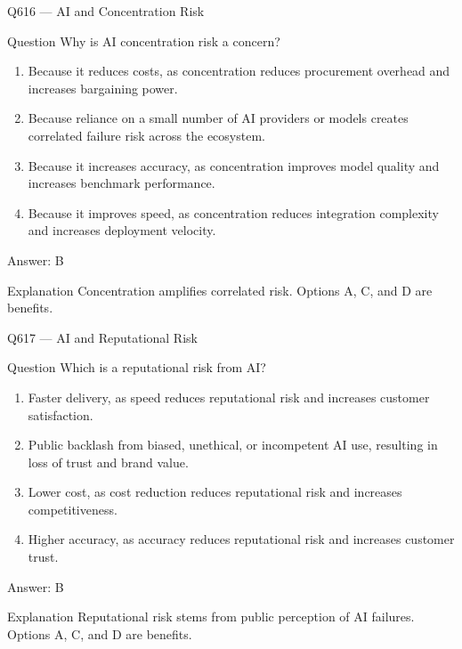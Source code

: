 \documentclass[aspectratio=169,8pt]{beamer}
\begin{document}
	\begin{frame}{Q616 --- AI and Concentration Risk}
		\begin{block}{Question}
			Why is AI concentration risk a concern?
			\begin{enumerate}
				\item Because it reduces costs, as concentration reduces procurement overhead and increases bargaining power.
				\item Because reliance on a small number of AI providers or models creates correlated failure risk across the ecosystem.
				\item Because it increases accuracy, as concentration improves model quality and increases benchmark performance.
				\item Because it improves speed, as concentration reduces integration complexity and increases deployment velocity.
			\end{enumerate}
		\end{block}
		\begin{exampleblock}{Answer: B}\end{exampleblock}
		\begin{block}{Explanation}
			Concentration amplifies correlated risk. Options A, C, and D are benefits.
		\end{block}
	\end{frame}
	
	\begin{frame}{Q617 --- AI and Reputational Risk}
		\begin{block}{Question}
			Which is a reputational risk from AI?
			\begin{enumerate}
				\item Faster delivery, as speed reduces reputational risk and increases customer satisfaction.
				\item Public backlash from biased, unethical, or incompetent AI use, resulting in loss of trust and brand value.
				\item Lower cost, as cost reduction reduces reputational risk and increases competitiveness.
				\item Higher accuracy, as accuracy reduces reputational risk and increases customer trust.
			\end{enumerate}
		\end{block}
		\begin{exampleblock}{Answer: B}\end{exampleblock}
		\begin{block}{Explanation}
			Reputational risk stems from public perception of AI failures. Options A, C, and D are benefits.
		\end{block}
	\end{frame}
	
\end{document}
